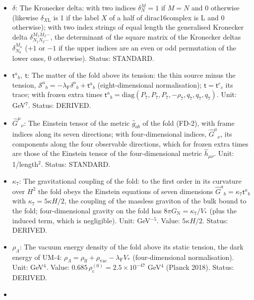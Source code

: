 \documentclass[
  10pt,
]{article}
\begin{document}
\begin{itemize}
  density, a difference of two squared masses, or an addition to an
  effective number of species). Status: STANDARD.
\item
  \(\delta\): The Kronecker delta: with two indices \(\delta^M_N = 1\)
  if \(M = N\) and 0 otherwise (likewise \(\delta_{X\mathrm{L}}\) is 1
  if the label \(X\) of a half of dirac16complex is L and 0 otherwise);
  with two index strings of equal length the generalised Kronecker delta
  \(\delta^{M_1M_2\cdots}_{N_1N_2\cdots}\), the determinant of the
  square matrix of the Kronecker deltas \(\delta^{M_a}_{N_b}\) (\(+1\)
  or \(-1\) if the upper indices are an even or odd permutation of the
  lower ones, 0 otherwise). Status: STANDARD.
\item
  \(\mathsf{t}^a{}_b,\ \mathsf{t}\): The matter of the fold above its
  tension: the thin source minus the tension,
  \(\mathcal{S}^a{}_b = -\lambda_{\mathrm{F}}\delta^a{}_b + \mathsf{t}^a{}_b\)
  (eight-dimensional normalisation); \(\mathsf{t} = \mathsf{t}^c{}_c\)
  its trace; with frozen extra times
  \(\mathsf{t}^a{}_b = \mathrm{diag}(P_7, P_7, P_7, -\rho_7, q_7, q_7, q_7)\).
  Unit: GeV\(^7\). Status: DERIVED.
\item
  \(\hat G^\mu{}_\nu\): The Einstein tensor of the metric
  \(\hat g_{ab}\) of the fold (FD-2), with frame indices along its seven
  directions; with four-dimensional indices, \(\hat G^\mu{}_\nu\), its
  components along the four observable directions, which for frozen
  extra times are those of the Einstein tensor of the four-dimensional
  metric \(\hat h_{\mu\nu}\). Unit: 1/length\(^2\). Status: STANDARD.
\item
  \(\kappa_7\): The gravitational coupling of the fold: to the first
  order in its curvature over \(H^2\) the fold obeys the Einstein
  equations of seven dimensions
  \(\hat G^a{}_b = \kappa_7\mathsf{t}^a{}_b\) with
  \(\kappa_7 = 5\kappa H/2\), the coupling of the massless graviton of
  the bulk bound to the fold; four-dimensional gravity on the fold has
  \(8\pi G_{\mathrm{N}} = \kappa_7/V_*\) (plus the induced term, which
  is negligible). Unit: GeV\(^{-5}\). Value: \(5\kappa H/2\). Status:
  DERIVED.
\item
  \(\rho_\Lambda\): The vacuum energy density of the fold above its
  static tension, the dark energy of UM-4:
  \(\rho_\Lambda = \rho_{\mathrm{ff}} + \rho_{\mathrm{vac}} - \lambda_{\mathrm{F}}V_*\)
  (four-dimensional normalisation). Unit: GeV\(^4\). Value:
  \(0.685\,\rho_{\mathrm{c}}^{(0)} = 2.5\times10^{-47}\) GeV\(^4\)
  (Planck 2018). Status: DERIVED.
\item

\end{itemize}
\end{document}
